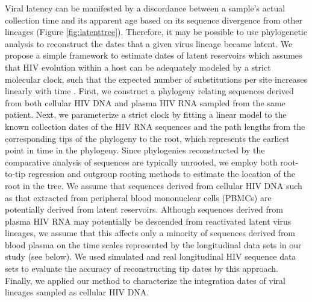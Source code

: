 \documentclass[12pt]{article}
\begin{document}

Viral latency can be manifested by a discordance between a sample's actual collection time and its apparent age based on its sequence divergence from other lineages (Figure \ref{fig:latenttree}). 
Therefore, it may be possible to use phylogenetic analysis to reconstruct the dates that a given virus lineage became latent.
We propose a simple framework to estimate dates of latent reservoirs which assumes that HIV evolution within a host can be adequately modeled by a strict molecular clock, such that the expected number of substitutions per site increases linearly with time \citep{Ho14}. 
First, we construct a phylogeny relating sequences derived from both cellular HIV DNA and plasma HIV RNA sampled from the same patient.
Next, we parameterize a strict clock by fitting a linear model to the known collection dates of the HIV RNA sequences and the path lengths from the corresponding tips of the phylogeny to the root, which represents the earliest point in time in the phylogeny. 
Since phylogenies reconstructed by the comparative analysis of sequences are typically unrooted, we employ both root-to-tip regression \citep{Korber00} and outgroup rooting methods to estimate the location of the root in the tree. 
We assume that sequences derived from cellular HIV DNA such as that extracted from peripheral blood mononuclear cells (PBMCs) are potentially derived from latent reservoirs. %
Although sequences derived from plasma HIV RNA may potentially be descended from reactivated latent virus lineages, we assume that this affects only a minority of sequences derived from blood plasma on the time scales represented by the longitudinal data sets in our study (see below).
We used simulated and real longitudinal HIV sequence data sets to evaluate the accuracy of reconstructing tip dates by this approach.
Finally, we applied our method to characterize the integration dates of viral lineages sampled as cellular HIV DNA.

%
\end{document}
